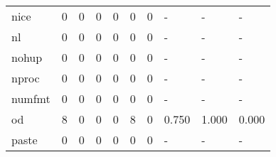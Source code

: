 \begin{longtable}{lp{1.3cm}p{1.3cm}p{1.3cm}p{1.3cm}p{1.3cm}p{1.3cm}p{1.3cm}p{1.3cm}p{1.3cm}}
nice      &                      0 &                                             0 &                                            0 &                                           0 &                                            0 &                                          0 &                                    - &                                      - &                                    - \\
nl        &                      0 &                                             0 &                                            0 &                                           0 &                                            0 &                                          0 &                                    - &                                      - &                                    - \\
nohup     &                      0 &                                             0 &                                            0 &                                           0 &                                            0 &                                          0 &                                    - &                                      - &                                    - \\
nproc     &                      0 &                                             0 &                                            0 &                                           0 &                                            0 &                                          0 &                                    - &                                      - &                                    - \\
numfmt    &                      0 &                                             0 &                                            0 &                                           0 &                                            0 &                                          0 &                                    - &                                      - &                                    - \\
od        &                      8 &                                             0 &                                            0 &                                           0 &                                            8 &                                          0 &                                0.750 &                                  1.000 &                                0.000 \\
paste     &                      0 &                                             0 &                                            0 &                                           0 &                                            0 &                                          0 &                                    - &                                      - &                                    - \\

\end{longtable}
